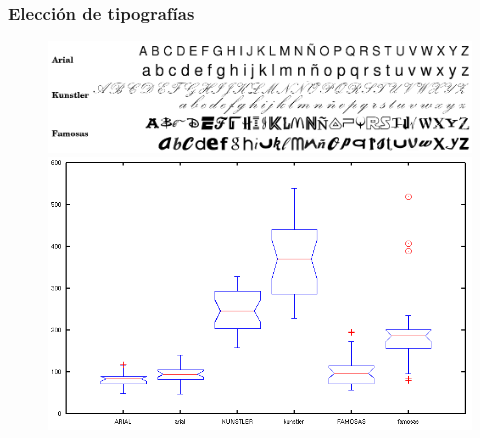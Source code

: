 \documentclass[10pt]{beamer}
\begin{document}
	\begin{frame}
	\frametitle{Elecci\'on de tipograf\'ias}
	    \begin{figure}
		\includegraphics[width=\textwidth]{graficos/letras.png}\\ \pause
		\includegraphics[width=0.8\textheight]{graficos/complejidadesBoxplot.png}
	    \end{figure}
	\end{frame}
\end{document}

